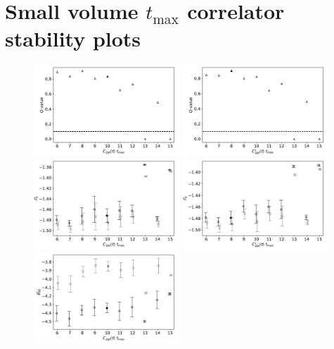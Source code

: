 \documentclass[prd,aps,twocolumn,superscriptaddress,tightenlines,nofootinbib,floatfix,preprintnumbers,10pt]{revtex4-1}
\begin{document}
\clearpage
\newpage
\section{Small volume $t_{\mathrm{max}}$ correlator stability plots}
\label{Appendix:small_volume_stability}
\begin{figure}[h]{
		\includegraphics[width=0.49\textwidth]{plots/figures/3296_2pt_tmax_Q.pdf}
		\includegraphics[width=0.49\textwidth]{plots/figures/3296_d2pt_tmax_Q.pdf}
		\includegraphics[width=0.49\textwidth]{plots/figures/3296_2pt_tmax_dZ0.pdf}
		\includegraphics[width=0.49\textwidth]{plots/figures/3296_d2pt_tmax_dZ0.pdf}
		\includegraphics[width=0.49\textwidth]{plots/figures/3296_2pt_tmax_dgV.pdf}
}
\end{figure}
\end{document}
